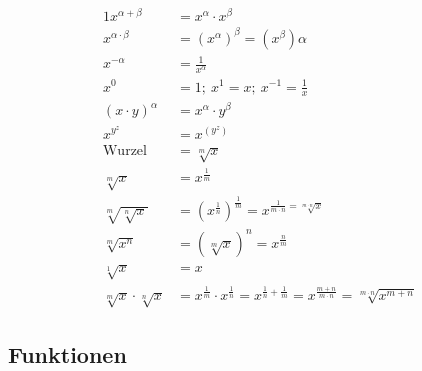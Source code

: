 \documentclass[12pt,a4paper]{article}
\begin{document}
\begin{alignat*}{1}
	x^{\alpha + \beta}            & = x^\alpha \cdot x^\beta                                                                                                        \\
	x^{\alpha \cdot \beta}        & = \left(x^\alpha\right)^\beta = \left(x^\beta\right)	\alpha                                                                     \\
	x^{-\alpha}                   & = \frac{1}{x^{\alpha}}                                                                                                          \\
	x^0                           & = 1;\ x^1 = x;\ x^{-1}    = \frac{1}{x}                                                                                         \\
	\left(x \cdot y\right)^\alpha & = x^\alpha \cdot y^\beta                                                                                                        \\
	x^{y^z}                       & = x^{\left(y^z\right)}                                                                                                          \\
	\textrm{Wurzel}               & = \sqrt[m]{x}                                                                                                                   \\
	\sqrt[m]{x}                   & = x^{\frac{1}{m}}                                                                                                               \\
	\sqrt[m]{\sqrt[n]{x}}         & = \left(x^{\frac{1}{n}}\right)^\frac{1}{m} = x^{\frac{1}{m \cdot n}=\sqrt[m \cdot n]{x}}                                        \\
	\sqrt[m]{x^n}                 & = \left(\sqrt[m]{x}\right)^n = x^{\frac{n}{m}}                                                                                  \\
	\sqrt[1]{x}                   & = x                                                                                                                             \\
	\sqrt[m]{x} \cdot \sqrt[n]{x} & = x^{\frac{1}{m}} \cdot x^{\frac{1}{n}} = x^{\frac{1}{n}+\frac{1}{m}} = x^{\frac{m+n}{m \cdot n}} = \sqrt[m \cdot n]{x^{m + n}}
\end{alignat*}
\subsection{Funktionen}
\end{document}
